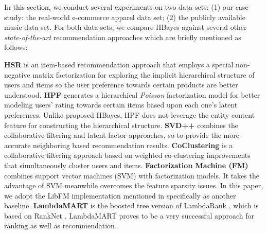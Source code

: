 In this section, we conduct several experiments on two data sets: (1) our case study: the real-world e-commerce apparel data set; (2) the publicly available music data set.  For both data sets, we compare HBayes against several other \emph{state-of-the-art} recommendation approaches which are briefly mentioned as follows:

{\noindent\textbf{HSR} \cite{wang2015exploring} is an item-based recommendation approach that employs a special non-negative matrix factorization for exploring the implicit hierarchical structure of users and items so the user preference towards certain products are better understood.  \newline %
\textbf{HPF} \cite{gopalan2015scalable} generates a hierarchical \emph{Poisson} factorization model for better modeling users' rating towards certain items based upon each one's latent preferences.  Unlike proposed HBayes, HPF does not leverage the entity content feature for constructing the hierarchical structure.  \newline %
\textbf{SVD++} \cite{mnih2008probabilistic, koren2008factorization} combines the collaborative filtering and latent factor approaches, so to provide the more accurate neighboring based recommendation results.  \newline %
\textbf{CoClustering} \cite{george2005scalable} is a collaborative filtering approach based on weighted co-clustering improvements that simultaneously cluster users and items.  \newline %
\textbf{Factorization Machine (FM)} \cite{rendle2010factorization,rendle2012factorization} combines support vector machines (SVM) with factorization models.  It takes the advantage of SVM meanwhile overcomes the feature sparsity issues.  In this paper, we adopt the LibFM implementation mentioned in \cite{rendle2012factorization} specifically as another baseline. \newline
\textbf{LambdaMART} \cite{burges2010ranknet} is the boosted tree version of LambdaRank \cite{donmez2009local}, which is based on RankNet \cite{burges2005learning}.  LambdaMART proves to be a very successful approach for ranking as well as recommendation.  %

}
